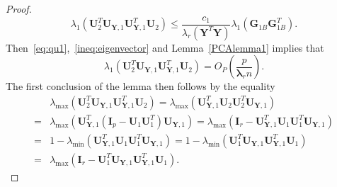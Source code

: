 \documentclass[12pt]{article} %
\newcommand{\bY}{\mathbf{Y}}
\newcommand{\bG}{\mathbf{G}}
\newcommand{\bI}{\mathbf{I}}
\newcommand{\bU}{\mathbf{U}}
\newcommand{\bfsym}[1]{\ensuremath{\boldsymbol{#1}}}
\def\blambda {\bfsym {\lambda}}
\theoremstyle{definition}
\begin{document}
\begin{appendices}
\begin{proof}
\begin{equation}
\lambda_{1}(\bU_{2}^T \bU_{\bY,1} \bU_{\bY,1}^T \bU_{2})\leq
\frac{c_1}{\lambda_r(\bY^T \bY)} \lambda_{1}
(\bG_{1B} \bG_{1B}^T).
    \end{equation}
    Then~\eqref{eq:qu1},~\eqref{ineq:eigenvector} and Lemma~\ref{PCAlemma1} implies that
    $$\lambda_{1}(\bU_{2}^T \bU_{\bY,1} \bU_{\bY,1}^T \bU_{2})=O_P(\frac{p}{\blambda_r n}).
    $$
 The first conclusion of the lemma then follows by the equality
$$
\begin{aligned}
&\lambda_{\max}(\bU_{2}^T \bU_{\bY,1} \bU_{\bY,1}^T \bU_{2})
=
\lambda_{\max}(\bU_{\bY,1}^T \bU_{2} \bU_{2}^T \bU_{\bY,1})\\
=&
    \lambda_{\max}(\bU_{\bY,1}^T (\bI_p-\bU_{1} \bU_{1}^T) \bU_{\bY,1})
    =
\lambda_{\max}(\bI_r-\bU_{\bY,1}^T\bU_{1} \bU_{1}^T \bU_{\bY,1})\\
=&
1-\lambda_{\min}(\bU_{\bY,1}^T\bU_{1} \bU_{1}^T \bU_{\bY,1})
=
1-\lambda_{\min}( \bU_{1}^T \bU_{\bY,1}\bU_{\bY,1}^T\bU_{1})\\
=&
\lambda_{\max}(\bI_r-\bU_{1}^T \bU_{\bY,1}\bU_{\bY,1}^T\bU_{1}).
\end{aligned}
$$


\end{proof}
\end{appendices}
\end{document}
